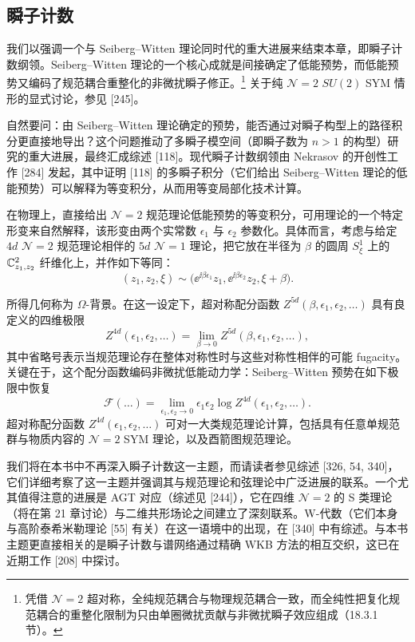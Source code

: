 \subsection{瞬子计数}

我们以强调一个与 Seiberg–Witten 理论同时代的重大进展来结束本章，即瞬子计数纲领。Seiberg–Witten 理论的一个核心成就是间接确定了低能预势，而低能预势又编码了规范耦合重整化的非微扰瞬子修正。\footnote{凭借 $\mathcal{N}=2$ 超对称，全纯规范耦合与物理规范耦合一致，而全纯性把复化规范耦合的重整化限制为只由单圈微扰贡献与非微扰瞬子效应组成（18.3.1 节）。} 关于纯 $\mathcal{N}=2$ $SU(2)$ SYM 情形的显式讨论，参见 [245]。

自然要问：由 Seiberg–Witten 理论确定的预势，能否通过对瞬子构型上的路径积分更直接地导出？这个问题推动了多瞬子模空间（即瞬子数为 $n>1$ 的构型）研究的重大进展，最终汇成综述 [118]。现代瞬子计数纲领由 Nekrasov 的开创性工作 [284] 发起，其中证明 [118] 的多瞬子积分（它们给出 Seiberg–Witten 理论的低能预势）可以解释为等变积分，从而用等变局部化技术计算。

在物理上，直接给出 $\mathcal{N}=2$ 规范理论低能预势的等变积分，可用理论的一个特定形变来自然解释，该形变由两个实常数 $\epsilon_1$ 与 $\epsilon_2$ 参数化。具体而言，考虑与给定 $4d$ $\mathcal{N}=2$ 规范理论相伴的 $5d$ $\mathcal{N}=1$ 理论，把它放在半径为 $\beta$ 的圆周 $S^1_\xi$ 上的 $\mathbb{C}^2_{z_1,z_2}$ 纤维化上，并作如下等同：
\[
(z_1,z_2,\xi)\sim\big(\ee^{\ii\beta\epsilon_1}z_1,\ee^{\ii\beta\epsilon_2}z_2,\xi+\beta\big).
\]

所得几何称为 $\Omega$-背景。在这一设定下，超对称配分函数 $Z^{5d}(\beta,\epsilon_1,\epsilon_2,\dots)$ 具有良定义的四维极限
\[
Z^{4d}(\epsilon_1,\epsilon_2,\dots)=\lim_{\beta\to0}Z^{5d}(\beta,\epsilon_1,\epsilon_2,\dots),
\]
其中省略号表示当规范理论存在整体对称性时与这些对称性相伴的可能 fugacity。关键在于，这个配分函数编码非微扰低能动力学：Seiberg–Witten 预势在如下极限中恢复
\[
\mathcal{F}(\dots)=\lim_{\epsilon_1,\epsilon_2\to0}\epsilon_1\epsilon_2\log Z^{4d}(\epsilon_1,\epsilon_2,\dots).
\]
超对称配分函数 $Z^{4d}(\epsilon_1,\epsilon_2,\dots)$ 可对一大类规范理论计算，包括具有任意单规范群与物质内容的 $\mathcal{N}=2$ SYM 理论，以及酉箭图规范理论。

我们将在本书中不再深入瞬子计数这一主题，而请读者参见综述 [326, 54, 340]，它们详细考察了这一主题并强调其与规范理论和弦理论中广泛进展的联系。一个尤其值得注意的进展是 AGT 对应（综述见 [244]），它在四维 $\mathcal{N}=2$ 的 S 类理论（将在第 21 章讨论）与二维共形场论之间建立了深刻联系。W-代数（它们本身与高阶泰希米勒理论 [55] 有关）在这一语境中的出现，在 [340] 中有综述。与本书主题更直接相关的是瞬子计数与谱网络通过精确 WKB 方法的相互交织，这已在近期工作 [208] 中探讨。

